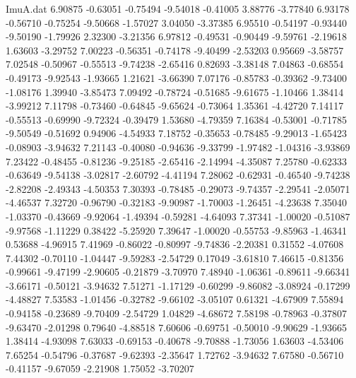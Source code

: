 \begin{filecontents}{ImuA.dat}
   6.90875   -0.63051   -0.75494   -9.54018   -0.41005    3.88776   -3.77840
   6.93178   -0.56710   -0.75254   -9.50668   -1.57027    3.04050   -3.37385
   6.95510   -0.54197   -0.93440   -9.50190   -1.79926    2.32300   -3.21356
   6.97812   -0.49531   -0.90449   -9.59761   -2.19618    1.63603   -3.29752
   7.00223   -0.56351   -0.74178   -9.40499   -2.53203    0.95669   -3.58757
   7.02548   -0.50967   -0.55513   -9.74238   -2.65416    0.82693   -3.38148
   7.04863   -0.68554   -0.49173   -9.92543   -1.93665    1.21621   -3.66390
   7.07176   -0.85783   -0.39362   -9.73400   -1.08176    1.39940   -3.85473
   7.09492   -0.78724   -0.51685   -9.61675   -1.10466    1.38414   -3.99212
   7.11798   -0.73460   -0.64845   -9.65624   -0.73064    1.35361   -4.42720
   7.14117   -0.55513   -0.69990   -9.72324   -0.39479    1.53680   -4.79359
   7.16384   -0.53001   -0.71785   -9.50549   -0.51692    0.94906   -4.54933
   7.18752   -0.35653   -0.78485   -9.29013   -1.65423   -0.08903   -3.94632
   7.21143   -0.40080   -0.94636   -9.33799   -1.97482   -1.04316   -3.93869
   7.23422   -0.48455   -0.81236   -9.25185   -2.65416   -2.14994   -4.35087
   7.25780   -0.62333   -0.63649   -9.54138   -3.02817   -2.60792   -4.41194
   7.28062   -0.62931   -0.46540   -9.74238   -2.82208   -2.49343   -4.50353
   7.30393   -0.78485   -0.29073   -9.74357   -2.29541   -2.05071   -4.46537
   7.32720   -0.96790   -0.32183   -9.90987   -1.70003   -1.26451   -4.23638
   7.35040   -1.03370   -0.43669   -9.92064   -1.49394   -0.59281   -4.64093
   7.37341   -1.00020   -0.51087   -9.97568   -1.11229    0.38422   -5.25920
   7.39647   -1.00020   -0.55753   -9.85963   -1.46341    0.53688   -4.96915
   7.41969   -0.86022   -0.80997   -9.74836   -2.20381    0.31552   -4.07608
   7.44302   -0.70110   -1.04447   -9.59283   -2.54729    0.17049   -3.61810
   7.46615   -0.81356   -0.99661   -9.47199   -2.90605   -0.21879   -3.70970
   7.48940   -1.06361   -0.89611   -9.66341   -3.66171   -0.50121   -3.94632
   7.51271   -1.17129   -0.60299   -9.86082   -3.08924   -0.17299   -4.48827
   7.53583   -1.01456   -0.32782   -9.66102   -3.05107    0.61321   -4.67909
   7.55894   -0.94158   -0.23689   -9.70409   -2.54729    1.04829   -4.68672
   7.58198   -0.78963   -0.37807   -9.63470   -2.01298    0.79640   -4.88518
   7.60606   -0.69751   -0.50010   -9.90629   -1.93665    1.38414   -4.93098
   7.63033   -0.69153   -0.40678   -9.70888   -1.73056    1.63603   -4.53406
   7.65254   -0.54796   -0.37687   -9.62393   -2.35647    1.72762   -3.94632
   7.67580   -0.56710   -0.41157   -9.67059   -2.21908    1.75052   -3.70207

\end{filecontents}
